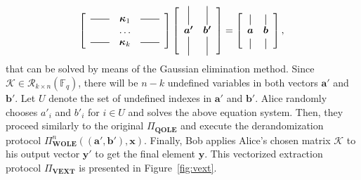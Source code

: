 \begin{equation*}
\left[
  \begin{array}{ccc}
    \bighorzbar & \bm{\kappa}_1 & \bighorzbar \\
    & \ldots & \\
    \bighorzbar & \bm{\kappa}_k & \bighorzbar \\
  \end{array}
\right] \left[
  \begin{array}{cc}
    \bigvertbar & \bigvertbar  \\
    \bm{a'} & \bm{b'} \\
    \bigvertbar  & \bigvertbar \\
  \end{array}
\right]  = \left[
  \begin{array}{cc}
    \vertbar & \vertbar\\
    \bm{a} & \bm{b}\\
    \vertbar & \vertbar\\
  \end{array}
\right],\\
\end{equation*}
that can be solved by means of the Gaussian elimination method. Since $\mathcal{K}\in \mathcal{R}_{k\times n}(\mathbb{F}_q)$, there will be $n-k$ undefined variables in both vectors $\bm{a}'$ and $\bm{b}'$. Let $U$ denote the set of undefined indexes in $\bm{a}'$ and $\bm{b}'$. Alice randomly chooses $a'_i$ and $b'_i$ for $i\in U$ and solves the above equation system. Then, they proceed similarly to the original $\Pi_{\textbf{QOLE}}$ and execute the derandomization protocol $\Pi^n_{\textbf{WOLE}}((\bm{a}',\bm{b}'), \bm{x})$. Finally, Bob applies Alice's chosen matrix $\mathcal{K}$ to his output vector $\bm{y}'$ to get the final element $\bm{y}$. This vectorized extraction protocol $\Pi_{\textbf{VEXT}}$ is presented in Figure~\ref{fig:vext}. 



